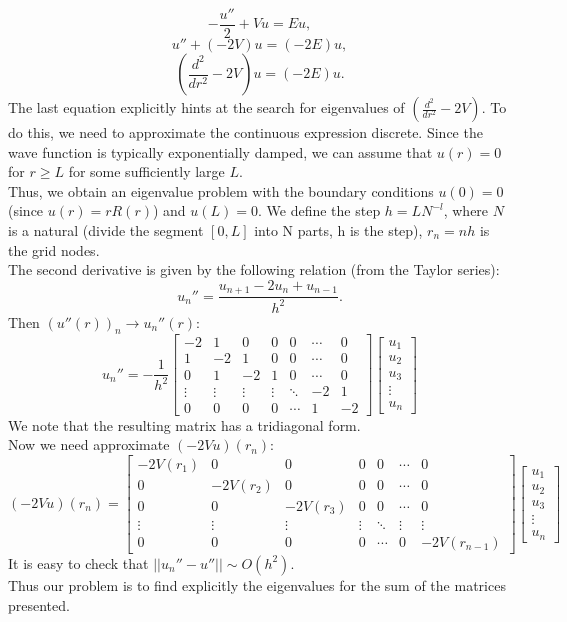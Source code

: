 \documentclass[a4paper, 12pt]{article}
\begin{document}
$$-\frac{u''}{2}+Vu = Eu,$$
$$u'' +(-2V)u = (-2E)u,$$
$$(\frac{d^2}{d r^2}-2V)u = (-2E)u.$$
The last equation explicitly hints at the search for eigenvalues of $(\frac{d^2}{d r^2}-2V)$. To do this, we need to approximate the continuous expression discrete. Since the wave function is typically exponentially damped, we can assume that $ u (r) = 0 $ for $ r \geq L $ for some sufficiently large $ L $. \\
Thus, we obtain an eigenvalue problem with the boundary conditions $u(0) = 0$(since $ u (r) = r R (r) $) and $ u (L) = 0 $. We define the step $ h = L N ^{-l}$, where $ N $ is a natural (divide the segment $ [0, L] $ into N parts, h is the step), $ r_n = nh $ is the grid nodes.\\
The second derivative is given by the following relation (from the Taylor series): $$\displaystyle{{u_n''} = \frac{u_{n+1}-2u_n +u_{n-1}}{h^2}}.$$ 
Then $(u''(r))_n \to u_n''(r):$
$$\displaystyle{u_n'' = -\frac{1}{h^2} \begin{bmatrix}
-2 & 1 &0&0&0& \cdots & 0 \\
1 & -2 & 1& 0&0&\cdots & 0 \\  
0&1 & -2 & 1& 0&\cdots & 0 \\  
\vdots & \vdots &\vdots & \vdots & \ddots & -2& 1  \\
0 & 0&0 &0& \cdots &1 & -2
\end{bmatrix}
\begin{bmatrix}
u_1
\\
u_2
\\
u_3
\\
\vdots
\\
u_n
\end{bmatrix}}$$
We note that the resulting matrix has a tridiagonal form.\\
Now we need approximate $(-2Vu)(r_n)$:
$$(-2Vu)(r_n) = \begin{bmatrix}
-2V(r_1) & 0 &0&0&0& \cdots & 0 \\
0 & -2V(r_2) & 0& 0&0&\cdots & 0 \\  
0&0 & -2V(r_3) & 0& 0&\cdots & 0 \\  
\vdots & \vdots &\vdots & \vdots & \ddots & \vdots& \vdots  \\
0 & 0&0 &0& \cdots &0 & -2V(r_{n-1})
\end{bmatrix}
\begin{bmatrix}
u_1
\\
u_2
\\
u_3
\\
\vdots
\\
u_n
\end{bmatrix}$$
It is easy to check that $\displaystyle{||u_n''-u''|| \sim O(h^2)}.$\\
Thus our problem is to find explicitly the eigenvalues for the sum of the matrices presented.
\end{document}
